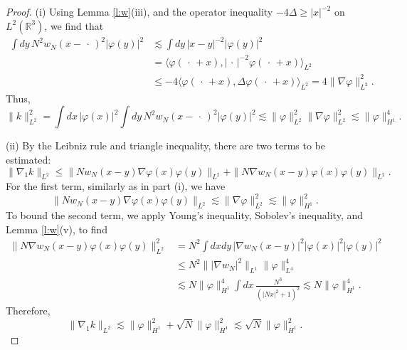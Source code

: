 \documentclass[11pt,a4paper]{scrartcl}
\newcommand{\R}{\mathds{R}}
\begin{document}
\begin{proof}
  (i) Using Lemma \ref{l:w}(iii), and the operator inequality $-4 \Delta \ge
  |x|^{-2}$ on $L^2(\R^3)$, we find that
  \begin{equation}
    \begin{aligned}
      \int dy \, N^2 w_N(x-\,\cdot\,)^2 |\varphi(y)|^2 & \apprle \int dy \,
      |x-y|^{-2} |\varphi(y)|^2 \\
      & = \langle \varphi(\,\cdot\,+x), |\,\cdot\,|^{-2} \varphi(\,\cdot\,+x)
      \rangle_{L^2} \\
      & \le -4 \langle \varphi(\,\cdot\,+x), \Delta \varphi(\,\cdot\,+x)
      \rangle_{L^2} = 4 \| \nabla \varphi \|_{L^2}^2.
    \end{aligned}
    \label{w}
  \end{equation}
  Thus,
  \[
    \| k \|_{L^2}^2 = \int dx \, |\varphi(x)|^2 \int dy \, N^2
    w_N(x-\,\cdot\,)^2 |\varphi(y)|^2 \apprle \| \varphi \|_{L^2}^2 \| \nabla
    \varphi \|_{L^2}^2 \apprle \| \varphi \|_{H^1}^4.
  \]


  (ii) By the Leibniz rule and triangle inequality, there are two terms to be
  estimated:
  \[
    \| \nabla_1 k \|_{L^2} \le \| N w_N(x-y) \nabla \varphi(x) \varphi(y)
    \|_{L^2} + \| N \nabla w_N(x-y) \varphi(x) \varphi(y) \|_{L^2}.
  \]
  For the first term, similarly as in part (i), we have
  \[
    \| N w_N(x-y) \nabla \varphi(x) \varphi(y) \|_{L^2} \apprle \| \nabla
    \varphi \|_{L^2}^2 \apprle \| \varphi \|_{H^1}^2.
  \]
  To bound the second term, we apply Young's inequality, Sobolev's inequality,
  and Lemma \ref{l:w}(v), to find
  \begin{align*}
    \| N \nabla w_N(x-y) \varphi(x) \varphi(y) \|_{L^2}^2 & = N^2 \int dx dy
    \, |\nabla w_N(x-y)|^2 |\varphi(x)|^2 |\varphi(y)|^2 \\
    & \le N^2 \| | \nabla w_N|^2 \|_{L^1} \| \varphi \|_{L^4}^4 \\
    & \apprle N \| \varphi \|_{H^1}^4 \int dx \, \frac{N^3}{(|Nx|^2 + 1)^2}
    \apprle N \| \varphi \|_{H^1}^4.
  \end{align*}
  Therefore,
  \[
    \| \nabla_1 k \|_{L^2} \apprle \| \varphi \|_{H^1}^2 + \sqrt{N} \| \varphi
    \|_{H^1}^2 \apprle \sqrt{N} \| \varphi \|_{H^1}^2.
  \]



\end{proof}
\end{document}
